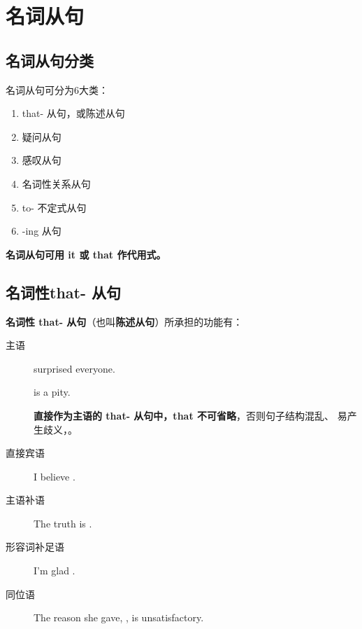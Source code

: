 \chapter{名词从句}

\section{名词从句分类}

名词从句可分为6大类：
\begin{enumerate}
\item that- 从句，或陈述从句

\item 疑问从句

\item 感叹从句

\item 名词性关系从句

\item to- 不定式从句

\item -ing 从句
\end{enumerate}

\textbf{名词从句可用 it 或 that 作代用式。}

\section{名词性that- 从句}
\label{subsubsec:thatclause}

\textbf{名词性 that- 从句}（也叫\textbf{陈述从句}）所承担的功能有：
\begin{description}
\item[主语]  surprised everyone.

   is a pity.

  \textbf{直接作为主语的 that- 从句中，that 不可省略}，否则句子结构混乱、
  易产生歧义，。

\item[直接宾语] I believe .
\item[主语补语] The truth is .
\item[形容词补足语] I'm glad .

\item[同位语] The reason she gave, , is unsatisfactory.

\end{description}

